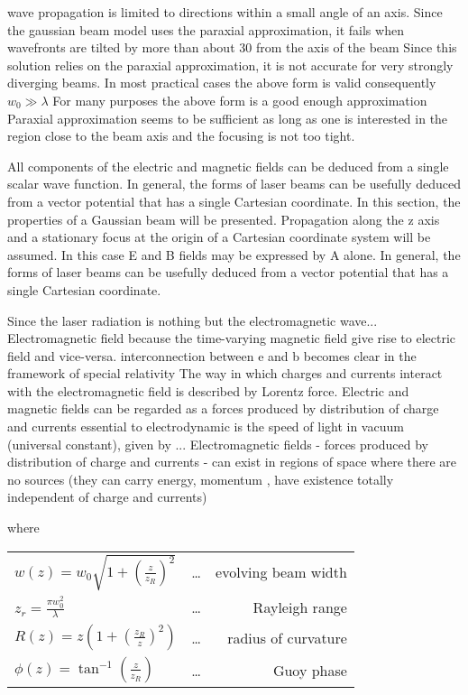 wave propagation is limited to directions within a small angle of an axis.
Since the gaussian beam model uses the paraxial approximation, it fails when wavefronts are tilted by more than about 30 from the axis of the beam
Since this solution relies on the paraxial approximation, it is not accurate for very strongly diverging beams. In most practical cases the above form is valid
consequently $  w_0 \gg \lambda $
For many purposes the above form is a good enough approximation
Paraxial approximation seems to be sufficient as long as one is interested in the region close to the beam axis and the focusing is not too tight.

All components of the electric and magnetic fields can be deduced from a single scalar wave function.
In general, the forms of laser beams can be usefully deduced from a vector potential that has a single Cartesian coordinate.
In this section, the properties of a Gaussian beam will be presented.
Propagation along the z axis and a stationary focus at the origin of a Cartesian coordinate system will be assumed.
In this case E and B fields may be expressed by A alone. 
In general, the forms of laser beams can be usefully deduced from a vector potential that
has a single Cartesian coordinate.

Since the laser radiation is nothing but the electromagnetic wave...
Electromagnetic field because the time-varying magnetic field give rise to electric field and vice-versa. interconnection between e and b becomes clear in the framework of special relativity
The way in which charges and currents interact with the electromagnetic field is described by Lorentz force.
Electric and magnetic fields can be regarded as a forces produced by distribution of charge and currents
essential to electrodynamic is the speed of light in vacuum (universal constant), given by ...
Electromagnetic fields - forces produced by distribution of charge and currents - can exist in regions of space where there are no sources (they can carry energy, momentum , have existence totally independent of charge and currents) 

where
\begingroup
\renewcommand*{\arraystretch}{2.0}
\begin{table}[h!]
	\begin{flushleft}
		\begin{tabular}{ l c r }
			$ w(z) = w_0 \sqrt{1 + \left(\frac{z}{z_R} \right)^2}  $ & \ldots & evolving beam width \\
			$ z_r = \frac{\pi w_0^2}{\lambda} $ & \ldots & Rayleigh range \\
			$ R(z) = z\left(1 + \left(\frac{z_R}{z} \right)^2 \right) $ & \ldots & radius of curvature \\
			$ \phi(z) = \tan^{-1}\left(\frac{z}{z_R} \right) $ & \ldots & Guoy phase 
		\end{tabular}
	\end{flushleft}
\end{table}
\endgroup

